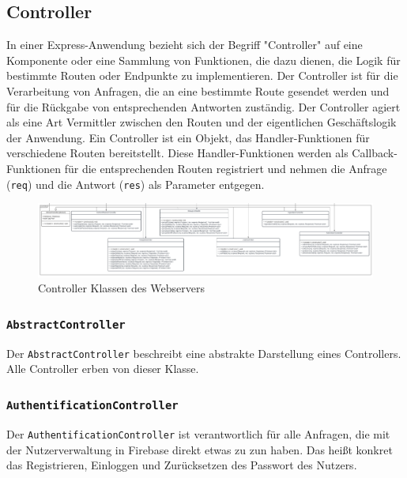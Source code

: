 \documentclass{entwurfsheft}
\begin{document}
\newpage

\subsection{Controller}
In einer Express-Anwendung bezieht sich der Begriff "Controller" auf eine Komponente oder eine Sammlung von Funktionen, die dazu dienen, die Logik für bestimmte Routen oder Endpunkte zu implementieren.
Der Controller ist für die Verarbeitung von Anfragen, die an eine bestimmte Route gesendet werden und für die Rückgabe von entsprechenden Antworten zuständig.
Der Controller agiert als eine Art Vermittler zwischen den Routen und der eigentlichen Geschäftslogik der Anwendung.
Ein Controller ist ein Objekt, das Handler-Funktionen für verschiedene Routen bereitstellt.
Diese Handler-Funktionen werden als Callback-Funktionen für die entsprechenden Routen registriert und nehmen die Anfrage (\texttt{req}) und die Antwort (\texttt{res}) als Parameter entgegen.



\begin{figure}[htp]
    \centering
    \includegraphics[width = 1\textwidth]{images/webserver/controller.pdf}
    \caption{Controller Klassen des Webservers}
    \label{fig:controller}
\end{figure}

\subsubsection{\texttt{AbstractController}}\label{sec:AbstractController}
Der \texttt{AbstractController} beschreibt eine abstrakte Darstellung eines Controllers. Alle Controller erben von dieser Klasse.

\subsubsection{\texttt{AuthentificationController}}\label{sec:AuthentificationController}
Der \texttt{AuthentificationController} ist verantwortlich für alle Anfragen, die mit der Nutzerverwaltung in Firebase direkt etwas zu zun haben. Das heißt konkret das Registrieren, Einloggen und Zurücksetzen des Passwort des Nutzers.
\end{document}

